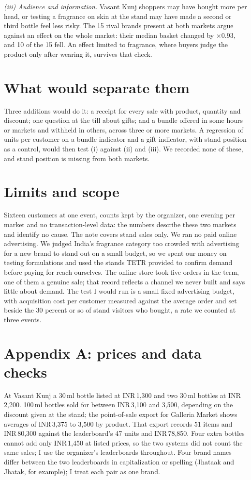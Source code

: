 \documentclass[11pt]{article}
\newcommand{\INR}{INR\,}
\newcommand{\x}{$\times$}
\begin{document}
\textit{(iii) Audience and information.} Vasant Kunj shoppers may have bought more per head, or testing a fragrance on skin at the stand may have made a second or third bottle feel less risky. The 15 rival brands present at both markets argue against an effect on the whole market: their median basket changed by \x0.93, and 10 of the 15 fell. An effect limited to fragrance, where buyers judge the product only after wearing it, survives that check.

\section{What would separate them}
Three additions would do it: a receipt for every sale with product, quantity and discount; one question at the till about gifts; and a bundle offered in some hours or markets and withheld in others, across three or more markets. A regression of units per customer on a bundle indicator and a gift indicator, with stand position as a control, would then test (i) against (ii) and (iii). We recorded none of these, and stand position is missing from both markets.

\section{Limits and scope}
Sixteen customers at one event, counts kept by the organizer, one evening per market and no transaction-level data: the numbers describe these two markets and identify no cause. The note covers stand sales only. We ran no paid online advertising. We judged India's fragrance category too crowded with advertising for a new brand to stand out on a small budget, so we spent our money on testing formulations and used the stands TETR provided to confirm demand before paying for reach ourselves. The online store took five orders in the term, one of them a genuine sale; that record reflects a channel we never built and says little about demand. The test I would run is a small fixed advertising budget, with acquisition cost per customer measured against the average order and set beside the 30 percent or so of stand visitors who bought, a rate we counted at three events.

\section*{Appendix A: prices and data checks}
At Vasant Kunj a 30\,ml bottle listed at \INR1,300 and two 30\,ml bottles at \INR2,200. 100\,ml bottles sold for between \INR3,100 and 3,500, depending on the discount given at the stand; the point-of-sale export for Galleria Market shows averages of \INR3,375 to 3,500 by product. That export records 51 items and \INR80,300 against the leaderboard's 47 units and \INR78,850. Four extra bottles cannot add only \INR1,450 at listed prices, so the two systems did not count the same sales; I use the organizer's leaderboards throughout. Four brand names differ between the two leaderboards in capitalization or spelling (Jhataak and Jhatak, for example); I treat each pair as one brand.
\end{document}
